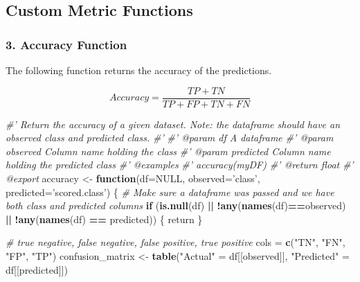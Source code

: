 \documentclass[
]{article}
\newenvironment{Shaded}{\begin{snugshade}}{\end{snugshade}}
\newcommand{\CommentTok}[1]{\textcolor[rgb]{0.56,0.35,0.01}{\textit{#1}}}
\newcommand{\ControlFlowTok}[1]{\textcolor[rgb]{0.13,0.29,0.53}{\textbf{#1}}}
\newcommand{\DataTypeTok}[1]{\textcolor[rgb]{0.13,0.29,0.53}{#1}}
\newcommand{\KeywordTok}[1]{\textcolor[rgb]{0.13,0.29,0.53}{\textbf{#1}}}
\newcommand{\NormalTok}[1]{#1}
\newcommand{\OperatorTok}[1]{\textcolor[rgb]{0.81,0.36,0.00}{\textbf{#1}}}
\newcommand{\OtherTok}[1]{\textcolor[rgb]{0.56,0.35,0.01}{#1}}
\newcommand{\StringTok}[1]{\textcolor[rgb]{0.31,0.60,0.02}{#1}}
\begin{document}
\hypertarget{custom-metric-functions}{%
\subsection{Custom Metric Functions}\label{custom-metric-functions}}

\hypertarget{accuracy-function}{%
\subsubsection{3. Accuracy Function}\label{accuracy-function}}

The following function returns the accuracy of the predictions.

\[ Accuracy = \frac{TP + TN}{TP + FP + TN + FN}\]

\begin{Shaded}
\begin{Highlighting}[]
\CommentTok{#' Return the accuracy of a given dataset.  Note: the dataframe should have an observed class and predicted class.}
\CommentTok{#'}
\CommentTok{#' @param df A dataframe}
\CommentTok{#' @param observed Column name holding the class}
\CommentTok{#' @param predicted Column name holding the predicted class}
\CommentTok{#' @examples}
\CommentTok{#' accuracy(myDF)}
\CommentTok{#' @return float}
\CommentTok{#' @export}
\NormalTok{accuracy <-}\StringTok{ }\ControlFlowTok{function}\NormalTok{(}\DataTypeTok{df=}\OtherTok{NULL}\NormalTok{, }\DataTypeTok{observed=}\StringTok{'class'}\NormalTok{, }\DataTypeTok{predicted=}\StringTok{'scored.class'}\NormalTok{) \{}
  \CommentTok{# Make sure a dataframe was passed and we have both class and predicted columns}
  \ControlFlowTok{if}\NormalTok{ (}\KeywordTok{is.null}\NormalTok{(df) }\OperatorTok{||}\StringTok{ }\OperatorTok{!}\KeywordTok{any}\NormalTok{(}\KeywordTok{names}\NormalTok{(df)}\OperatorTok{==}\NormalTok{observed) }\OperatorTok{||}\StringTok{ }\OperatorTok{!}\KeywordTok{any}\NormalTok{(}\KeywordTok{names}\NormalTok{(df) }\OperatorTok{==}\StringTok{ }\NormalTok{predicted)) \{}
\NormalTok{    return}
\NormalTok{  \}}

  \CommentTok{# true negative, false negative, false positive, true positive}
\NormalTok{  cols =}\StringTok{ }\KeywordTok{c}\NormalTok{(}\StringTok{"TN"}\NormalTok{, }\StringTok{"FN"}\NormalTok{, }\StringTok{"FP"}\NormalTok{, }\StringTok{"TP"}\NormalTok{)}
\NormalTok{  confusion_matrix <-}\StringTok{ }\KeywordTok{table}\NormalTok{(}\StringTok{"Actual"}\NormalTok{ =}\StringTok{ }\NormalTok{df[[observed]], }
                            \StringTok{"Predicted"}\NormalTok{ =}\StringTok{ }\NormalTok{df[[predicted]])}
  

\end{Highlighting}
\end{Shaded}
\end{document}
